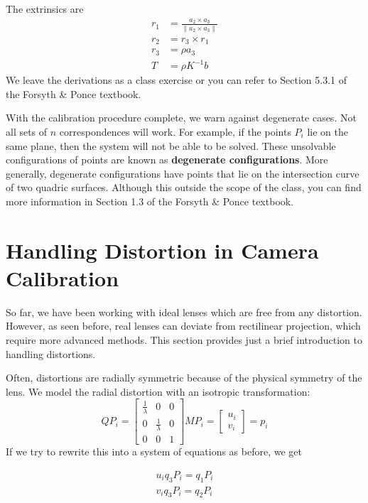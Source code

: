\documentclass[a4paper, 12pt]{article}
\renewcommand\emph{\textbf}
\begin{document}
The extrinsics are 
\begin{equation}\begin{aligned}
    r_1 &= \frac{a_2\times a_3}{\|a_2\times a_3\|}\\
    r_2 &= r_3\times r_1\\
    r_3 &= \rho a_3\\
    T &= \rho K^{-1} b
\end{aligned}\end{equation}
We leave the derivations as a class exercise or you can refer to Section 5.3.1 of the Forsyth \& Ponce textbook.

With the calibration procedure complete, we warn against degenerate cases. Not all sets of $n$ correspondences will work. For example, if the points $P_i$ lie on the same plane, then the system will not be able to be solved. These unsolvable configurations of points are known as \emph{degenerate configurations}. More generally, degenerate configurations have points that lie on the intersection curve of two quadric surfaces. Although this outside the scope of the class, you can find more information in Section 1.3 of the Forsyth \& Ponce textbook. 

\section{Handling Distortion in Camera Calibration}
So far, we have been working with ideal lenses which are free from any distortion. However, as seen before, real lenses can deviate from rectilinear projection, which require more advanced methods. This section provides just a brief introduction to handling distortions. 

Often, distortions are radially symmetric because of the physical symmetry of the lens. We model the radial distortion with an isotropic transformation:
\begin{equation}
    QP_i = \begin{bmatrix}
    \frac{1}{\lambda}&0&0\\0 &    \frac{1}{\lambda} & 0 \\ 0 & 0 &1\end{bmatrix} M P_i = \begin{bmatrix}
    u_i\\v_i\end{bmatrix}
    = p_i
\end{equation}
If we try to rewrite this into a system of equations as before, we get 

\begin{align*}
    u_iq_3P_i  = q_1P_i\\
    v_iq_3P_i  = q_2P_i
\end{align*}
\end{document}
